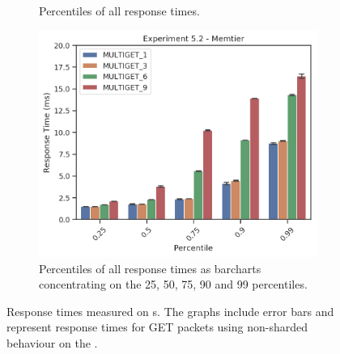 \begin{figure}
\begin{subfigure}[t!]{0.56\textwidth}
                \caption{Percentiles of all response times.\label{fig:noshard_mt_rt_percentiles}}
                \includegraphics[width=\textwidth]{../data_analysis/figures/5-2_mt_percentiles_bar.png}
                \caption{Percentiles of all response times as barcharts concentrating on the 25, 50, 75, 90 and 99
                percentiles.\label{fig:noshard_mt_rt_percentiles-bar}}
            \end{subfigure}
            \caption{Response times measured on \cli{}s. The graphs include error bars and represent response times
                     for GET packets using non-sharded behaviour on the \mw.\label{fig:noshard_mt}}
        \end{figure}

